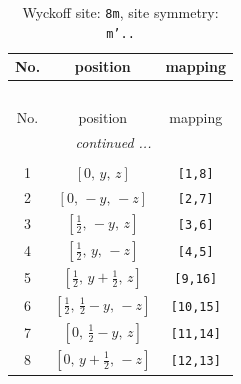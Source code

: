 \documentclass[fleqn,8pt]{jsarticle}
\begin{document}
\begin{longtable}{ccc}
\caption{Wyckoff site: {\tt 8m}, site symmetry: {\tt m'..}}
 \\
 \hline \hline
No. & position & mapping \\ \hline \endfirsthead

\multicolumn{2}{l}{\tablename\ \thetable{}} \\
 \hline \hline
No. & position & mapping \\ \hline \endhead

 \hline \hline
\multicolumn{2}{r}{\footnotesize\it continued ...} \\ \endfoot

 \hline \hline
\multicolumn{2}{r}{} \\ \endlastfoot

1 & $\left[ 0,\, y,\, z \right]$ & {\tt [1,8]} \\ \hline
2 & $\left[ 0,\, - y,\, - z \right]$ & {\tt [2,7]} \\ \hline
3 & $\left[ \frac{1}{2},\, - y,\, z \right]$ & {\tt [3,6]} \\ \hline
4 & $\left[ \frac{1}{2},\, y,\, - z \right]$ & {\tt [4,5]} \\ \hline
5 & $\left[ \frac{1}{2},\, y + \frac{1}{2},\, z \right]$ & {\tt [9,16]} \\ \hline
6 & $\left[ \frac{1}{2},\, \frac{1}{2} - y,\, - z \right]$ & {\tt [10,15]} \\ \hline
7 & $\left[ 0,\, \frac{1}{2} - y,\, z \right]$ & {\tt [11,14]} \\ \hline
8 & $\left[ 0,\, y + \frac{1}{2},\, - z \right]$ & {\tt [12,13]} \\
\end{longtable}
\renewcommand{\arraystretch}{1.2}
\end{document}

